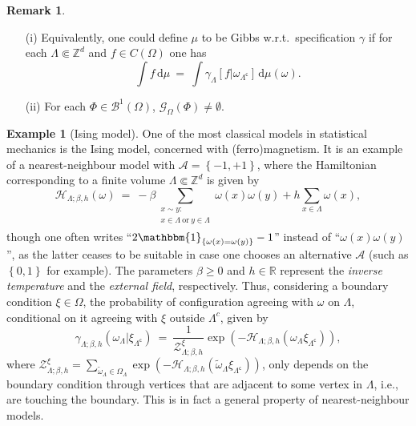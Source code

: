 \documentclass[12pt]{article}
\newcommand{\A}{\mathcal{A}}
\newcommand{\BB}{\mathscr{B}}
\renewcommand{\d}{\mathrm{d}}
\newcommand{\G}{\mathcal{G}}
\renewcommand{\H}{\mathcal{H}}
\newcommand{\R}{\mathbb{R}}
\newcommand{\Z}{\mathbb{Z}}
\newcommand{\ZZ}{\mathcal{Z}}
\newcommand{\set}[1]{\left\{#1\right\}}
\newcommand{\1}{\mathbbm{1}}
\renewcommand{\c}{\mathsf{c}}
\newcommand{\5}{\vspace{0.5cm}}
\renewcommand{\tilde}{\widetilde}
\theoremstyle{definition}
\newtheorem{ex}[thm]{Example}
\newtheorem{rem}[thm]{Remark}
\begin{document}
\begin{rem}\label{Rem:DLR}
~
\begin{itemize}
	\item[(i)] Equivalently, one could define $\mu$ to be Gibbs w.r.t.~specification $\gamma$ if for each $\Lambda\Subset\Z^d$ and $f\in C(\Omega)$ one has
	$$\int f\,\d\mu ~=~ \int\gamma_\Lambda[f|\omega_{\Lambda^\c}]\,\d\mu(\omega).$$
	\item[(ii)] For each $\Phi\in\BB^1(\Omega)$, $\G_\Omega(\Phi)\neq\emptyset$.
\end{itemize}
\end{rem}

\begin{ex}[Ising model]
One of the most classical models in statistical mechanics is the Ising model, concerned with (ferro)magnetism. It is an example of a nearest-neighbour model with $\A=\set{-1,+1}$, where the Hamiltonian corresponding to a finite volume $\Lambda\Subset\Z^d$ is given by
$$\H_{\Lambda;\beta,h}(\omega) ~=~ -\beta\!\!\!\!\!\!\!\sum_{\substack{x\sim y:\\x\in\Lambda~\text{or}~y\in\Lambda\\}}\!\!\!\!\!\!\!\omega(x)\omega(y) + h\sum_{x\in\Lambda}\omega(x),$$
though one often writes ``$2\1_{\set{\omega(x)=\omega(y)}}-1$'' instead of ``$\omega(x)\omega(y)$'', as the latter ceases to be suitable in case one chooses an alternative $\A$ (such as $\set{0,1}$ for example). The parameters $\beta\geq 0$ and $h\in\R$ represent the \textit{inverse temperature} and the \textit{external field}, respectively. Thus, considering a boundary condition $\xi\in\Omega$, the probability of configuration agreeing with $\omega$ on $\Lambda$, conditional on it agreeing with $\xi$ outside $\Lambda^c$, given by
$$\gamma_{\Lambda;\beta,h}(\omega_\Lambda|\xi_{\Lambda^\c}) ~=~ \frac{1}{\ZZ_{\Lambda;\beta,h}^\xi}\exp(-\H_{\Lambda;\beta,h}(\omega_\Lambda\xi_{\Lambda^\c})),$$
where $\ZZ_{\Lambda;\beta,h}^\xi=\sum_{\tilde{\omega}_\Lambda\in\Omega_\Lambda}\exp(-\H_{\Lambda;\beta,h}(\tilde{\omega}_\Lambda\xi_{\Lambda^\c}))$, only depends on the boundary condition through vertices that are adjacent to some vertex in $\Lambda$, i.e., are touching the boundary. This is in fact a general property of nearest-neighbour models.
\end{ex}
\end{document}
